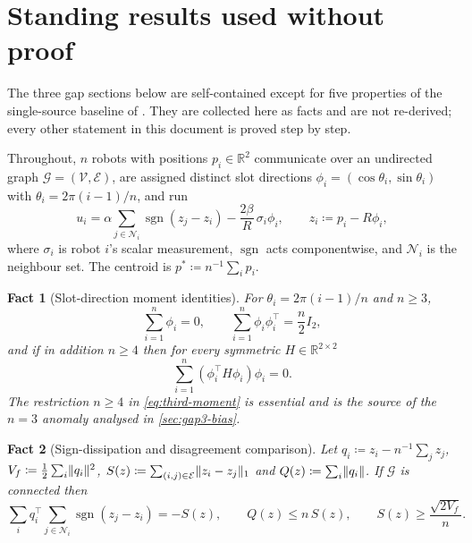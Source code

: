 \documentclass[11pt,a4paper]{article}
\theoremstyle{plain}
\newtheorem{fact}{Fact}
\theoremstyle{definition}
\newcommand{\R}{\mathbb{R}}
\newcommand{\V}{\mathcal{V}}
\newcommand{\E}{\mathcal{E}}
\newcommand{\G}{\mathcal{G}}
\DeclareMathOperator{\sgn}{sgn}
\DeclarePairedDelimiter{\norm}{\lVert}{\rVert}
\newcommand{\NotationContext}[1]{\markboth{#1}{#1}}
\begin{document}
\section{Standing results used without proof}\label{sec:facts}
\NotationContext{facts}

The three gap sections below are self-contained except for five properties of the
single-source baseline of \cite{du2024}. They are collected here as facts and are not
re-derived; every other statement in this document is proved step by step.

Throughout, $n$ robots with positions $p_i\in\R^2$ communicate over an undirected graph
$\G=(\V,\E)$, are assigned distinct slot directions
$\phi_i=(\cos\theta_i,\sin\theta_i)$ with $\theta_i=2\pi(i-1)/n$, and run
\begin{equation}\label{eq:baseline-controller}
    u_i=\alpha\sum_{j\in\mathcal{N}_i}\sgn\!\left(z_j-z_i\right)
       -\frac{2\beta}{R}\,\sigma_i\phi_i,
    \qquad z_i\coloneqq p_i-R\phi_i,
\end{equation}
where $\sigma_i$ is robot $i$'s scalar measurement, $\sgn$ acts componentwise, and
$\mathcal{N}_i$ is the neighbour set. The centroid is $p^*\coloneqq n^{-1}\sum_ip_i$.

\begin{fact}[Slot-direction moment identities]\label{fact:moments}
For $\theta_i=2\pi(i-1)/n$ and $n\geq3$,
\begin{equation}\label{eq:moments}
    \sum_{i=1}^n\phi_i=0,
    \qquad
    \sum_{i=1}^n\phi_i\phi_i^{\top}=\frac n2 I_2,
\end{equation}
and if in addition $n\geq4$ then for every symmetric $H\in\R^{2\times2}$
\begin{equation}\label{eq:third-moment}
    \sum_{i=1}^n\left(\phi_i^{\top}H\phi_i\right)\phi_i=0.
\end{equation}
The restriction $n\geq4$ in \eqref{eq:third-moment} is essential and is the source of the
$n=3$ anomaly analysed in \cref{sec:gap3-bias}.
\end{fact}

\begin{fact}[Sign-dissipation and disagreement comparison]\label{fact:sign}
Let $q_i\coloneqq z_i-n^{-1}\sum_jz_j$, $V_f\coloneqq\frac12\sum_i\norm{q_i}^2$,
$S(z)\coloneqq\sum_{(i,j)\in\E}\norm{z_i-z_j}_1$ and $Q(z)\coloneqq\sum_i\norm{q_i}$.
If $\G$ is connected then
\begin{equation}\label{eq:sign-dissipation}
    \sum_i q_i^{\top}\sum_{j\in\mathcal{N}_i}\sgn\!\left(z_j-z_i\right)=-S(z),
    \qquad
    Q(z)\leq n\,S(z),
    \qquad
    S(z)\geq\frac{\sqrt{2V_f}}{n}.
\end{equation}
\end{fact}
\end{document}
